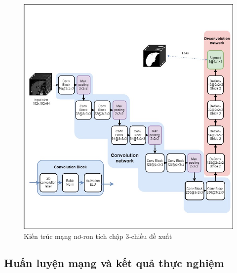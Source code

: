 \begin{figure}[h]
\centering
    \includegraphics[totalheight=15cm]{Images/CNN_org.jpg}
    \caption{Kiến trúc mạng nơ-ron tích chập 3-chiều đề xuất}
    \label{our_CNN_org}
\end{figure}
\subsection{Huấn luyện mạng và kết quả thực nghiệm}
